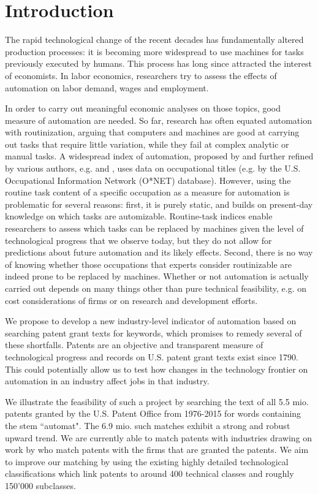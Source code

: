 \documentclass[11pt,a4paper,fleqn]{article}
\begin{document}
\newpage
\section{Introduction}
The rapid technological change of the recent decades has fundamentally altered production processes: it is becoming more widespread to use machines for tasks previously executed by humans. This process has long since attracted the interest of economists. In labor economics, researchers try to assess the effects of automation on labor demand, wages and employment. 

In order to carry out meaningful economic analyses on those topics, good measure of automation are needed. So far, research has often equated automation with routinization, arguing that computers and machines are good at carrying out tasks that require little variation, while they fail at complex analytic or manual tasks. A widespread index of automation, proposed by \cite{ALM2003} and further refined by various authors, e.g. \cite{AKK2008} and \cite{AD2013}, uses data on occupational titles (e.g. by the U.S. Occupational Information Network (O*NET) database). However, using the routine task content of a specific occupation as a measure for automation is problematic for several reasons: first, it is purely static, and builds on present-day knowledge on which tasks are automizable. Routine-task indices enable researchers to assess which tasks can be replaced by machines given the level of technological progress that we observe today, but they do not allow for predictions about future automation and its likely effects. Second, there is no way of knowing whether those occupations that experts consider routinizable are indeed prone to be replaced by machines. Whether or not automation is actually carried out depends on many things other than pure technical feasibility, e.g. on cost considerations of firms or on research and development efforts. 

We propose to develop a new industry-level indicator of automation based on searching patent grant texts for keywords, which promises to remedy several of these shortfalls. Patents are an objective and transparent measure of technological progress and records on U.S. patent grant texts exist since 1790. This could potentially allow us to test how changes in the technology frontier on automation in an industry affect jobs in that industry. 

We illustrate the feasibility of such a project by searching the text of all 5.5 mio. patents granted by the U.S. Patent Office from 1976-2015 for words containing the stem ``automat". The 6.9 mio. such matches exhibit a strong and robust upward trend. We are currently able to match patents with industries drawing on work by \cite{HJT2001} who match patents with the firms that are granted the patents. We aim to improve our matching by using the existing highly detailed technological classifications which link patents to around 400 technical classes and roughly 150'000 subclasses. 
\end{document}
